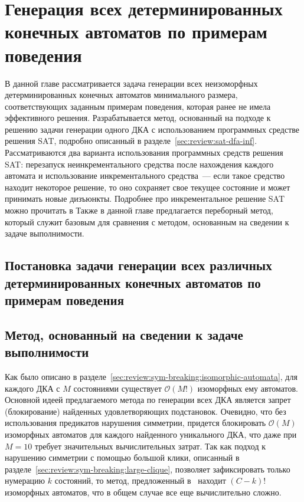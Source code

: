 
\chapter{Генерация всех детерминированных конечных автоматов по примерам поведения} 
\label{sec:findall}

В данной главе рассматривается задача генерации всех неизоморфных детерминированных конечных автоматов минимального размера, соответствующих заданным примерам поведения, которая ранее не имела эффективного решения.
Разрабатывается метод, основанный на подходе к решению задачи генерации одного ДКА с использованием программных средстве решения SAT, подробно описанный в разделе~\ref{sec:review:sat-dfa-inf}.
Рассматриваются два варианта использования программных средств решения SAT: перезапуск неинкрементального средства после нахождения каждого автомата и использование инкрементального средства~{---} если такое средство находит некоторое решение, то оно сохраняет свое текущее состояние и может принимать новые дизъюнкты.
Подробнее про инкрементальное решение SAT можно прочитать в%
Также в данной главе предлагается переборный метод, который служит базовым для сравнения с методом, основанным на сведении к задаче выполнимости.


\section{Постановка задачи генерации всех различных детерминированных конечных автоматов по примерам поведения}
\label{sec:findall:problem}



\section{Метод, основанный на сведении к задаче выполнимости}
\label{sec:findall:SAT-based}

Как было описано в разделе~\ref{sec:review:sym-breaking:isomorphic-automata}, для каждого ДКА с $M$ состояниями существует $\mathcal{O}\left(M!\right)$ изоморфных ему автоматов.
Основной идеей предлагаемого метода по генерации всех ДКА является запрет (блокирование) найденных удовлетворяющих подстановок.
Очевидно, что без использования предикатов нарушения симметрии, придется блокировать $\mathcal{O}\left(M\right)$ изоморфных автоматов для каждого найденного уникального ДКА, что даже при $M = 10$ требует значительных вычислительных затрат.
Так как подход к нарушению симметрии с помощью большой клики, описанный в разделе~\ref{sec:review:sym-breaking:large-clique}, позволяет зафиксировать только нумерацию $k$ состояний, то метод, предложенный в~\cite{heule-icgi10} находит $\left(C - k\right)!$ изоморфных автоматов, что в общем случае все еще вычислительно сложно.

